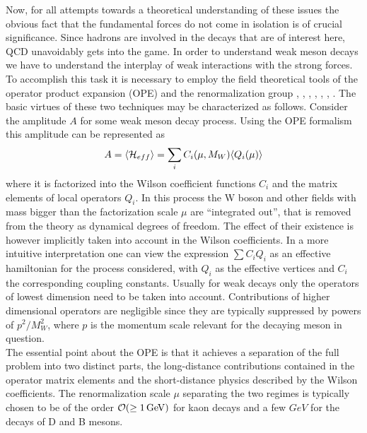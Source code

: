 Now, for all attempts towards a theoretical understanding of these
issues the obvious fact that the fundamental forces do not come in
isolation is of crucial significance. Since hadrons are involved in the
decays that are of interest here, QCD unavoidably gets into the game.
In order to understand weak meson decays we have to understand the
interplay of weak interactions with the strong forces.\\
To accomplish this task it is necessary to employ the field
theoretical tools of the operator product expansion (OPE)
\cite{wilsonzim:72} and the renormalization group
\cite{stueckelberg:53}, \cite{gellmannlow:54}, \cite{ovsyannikov:56},
\cite{symanzik:70}, \cite{callan:70}, \cite{thooft:73},
\cite{weinberg:73}. The basic virtues of these two techniques may be
characterized as follows. Consider the amplitude $A$ for some weak
meson decay process. Using the OPE formalism this amplitude can be
represented as \cite{witten:77}
\begin{equation}
A=\langle {\cal H}_{eff}\rangle =\sum_i C_i(\mu, M_W)
                                        \langle Q_i(\mu)\rangle
\label{ahcq}
\end{equation}
where it is factorized into the Wilson coefficient functions $C_i$ and
the matrix elements of local operators $Q_i$. In this process the W
boson and other fields with mass bigger than the factorization scale
$\mu$
are ``integrated out'', that is removed from the theory as dynamical
degrees of freedom. The effect of their existence is however implicitly
taken into account in the Wilson coefficients. In a more intuitive
interpretation one can view the expression $\sum C_i Q_i$ as an effective
hamiltonian for the process considered, with $Q_i$ as the effective
vertices and $C_i$ the corresponding coupling constants. Usually for
weak decays only the operators of lowest dimension need to be taken into
account. Contributions of higher dimensional operators are negligible
since they are typically suppressed by powers of $p^2/M^2_W$, where $p$
is the momentum scale relevant for the decaying meson in question.
\\
The essential point about the OPE is that it achieves a separation of
the full problem into two distinct parts, the long-distance contributions
contained in the operator matrix elements and the short-distance physics
described by the Wilson coefficients. The renormalization scale $\mu$
separating the two regimes is typically chosen to be
of the order ${\cal O}(\geq 1\, {\rm GeV})$ for
kaon decays and a few $GeV$ for the decays of D and B mesons.
